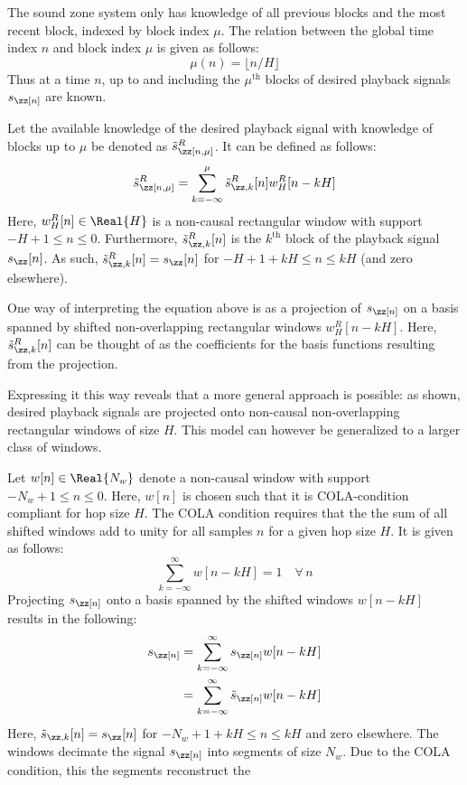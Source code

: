 The sound zone system only has knowledge of all previous blocks and the most recent block, indexed by block index $\mu$.
The relation between the global time index $n$ and block index $\mu$ is given as follows:  
\begin{equation}
    \mu(n) = \lfloor n / H \rfloor
\end{equation}
Thus at a time $n$, up to and including the $\mu^\text{th}$ blocks of desired playback signals $s_\zz[n]$ are known.

Let the available knowledge of the desired playback signal with knowledge of blocks up to $\mu$ be denoted as $\tilde{s}^R_\zz[n, \mu]$.
It can be defined as follows:
\begin{align}
    \tilde{s}^R_\zz[n, \mu] = \sum_{k=-\infty}^{\mu} \tilde{s}^R_{\zz,k}[n]w^R_H[n - kH]
\end{align}
Here, $w^R_H[n]\in\Real{H}$ is a non-causal rectangular window with support $-H + 1 \leq n \leq 0$. 
Furthermore, $\tilde{s}^R_{\zz,k}[n]$ is the $k^\text{th}$ block of the playback signal $s_{\zz}[n]$.
As such, $\tilde{s}^R_{\zz,k}[n] = s_{\zz}[n]$ for $-H + 1 + kH \leq n \leq kH$ (and zero elsewhere).  

One way of interpreting the equation above is as a projection of $s_\zz[n]$ on a 
basis spanned by shifted non-overlapping rectangular windows $w^R_H[n - kH]$.
Here, $\tilde{s}^R_{\zz,k}[n]$ can be thought of as the coefficients for the basis functions resulting from the projection.

Expressing it this way reveals that a more general approach is possible:
as shown, desired playback signals are projected onto non-causal non-overlapping rectangular windows of size $H$.
This model can however be generalized to a larger class of windows.

Let $w[n]\in\Real{N_w}$ denote a non-causal window with support $-N_w + 1 \leq n \leq 0$.
Here, $w[n]$ is chosen such that it is COLA-condition compliant for hop size $H$.
The COLA condition requires that the the sum of all shifted windows add to unity for all samples $n$ for a given hop size $H$. 
It is given as follows:
\begin{equation}
     \sum_{k=-\infty}^{\infty} w[n - kH] = 1 \quad\forall\,n
\end{equation}
Projecting $s_\zz[n]$ onto a basis spanned by the shifted windows $w[n - kH]$ results in the following:
\begin{align}
    s_\zz[n] &= \sum_{k=-\infty}^{\infty} s_\zz[n]w[n - kH] \\
             &= \sum_{k=-\infty}^{\infty} \tilde{s}_\zz[n]w[n - kH]
\end{align}
Here, $\tilde{s}_{\zz,k}[n] = s_{\zz}[n]$ for $-N_w + 1 + kH \leq n \leq kH$ and zero elsewhere.  
The windows decimate the signal $s_\zz[n]$ into segments of size $N_w$. 
Due to the COLA condition, this the segments reconstruct the 

